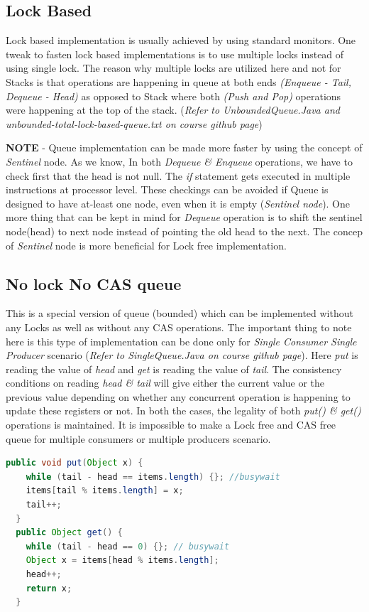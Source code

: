 \documentclass[twoside]{article}
\begin{document}
\subsection{Lock Based}

Lock based implementation is usually achieved by using standard monitors. One tweak to fasten lock based implementations is to use multiple locks instead of using single lock. The reason why multiple locks are utilized here and not for Stacks is that operations are happening in queue at both ends \textit{(Enqueue - Tail, Dequeue - Head)} as opposed to Stack where both \textit{(Push and Pop)} operations were happening at the top of the stack. (\textit{Refer to UnboundedQueue.Java and unbounded-total-lock-based-queue.txt on course github page})

\textbf{NOTE} - Queue implementation can be made more faster by using the concept of \textit{Sentinel} node. As we know, In both \textit{Dequeue \& Enqueue} operations, we have to check first that the head is not null. The \textit{if} statement gets executed in multiple instructions at processor level. These checkings can be avoided if Queue is designed to have at-least one node, even when it is empty (\textit{Sentinel node}). One more thing that can be kept in mind for \textit{Dequeue} operation is to shift the sentinel node(head) to next node instead of pointing the old head to the next. The concep of \textit{Sentinel} node is more beneficial for Lock free implementation.

\subsection{No lock No CAS queue}
This is a special version of queue (bounded) which can be implemented without any Locks as well as without any CAS operations. The important thing to note here is this type of implementation can be done only for \textit{Single Consumer Single Producer} scenario (\textit{Refer to SingleQueue.Java on course github page}). Here \textit{put} is reading the value of \textit{head} and \textit{get} is reading the value of \textit{tail}. The consistency conditions on reading \textit{head \& tail} will give either the current value or the previous value depending on whether any concurrent operation is happening to update these registers or not. In both the cases, the legality of both \textit{put() \& get()} operations is maintained. It is impossible to make a Lock free and CAS free queue for multiple consumers or multiple producers scenario.
\begin{center}
\renewcommand{\lstlistingname}{Code}
\begin{lstlisting}[language=Java, caption=No Lock No CAS Queue, frame=single]
  public void put(Object x) {
    while (tail - head == items.length) {}; //busywait
    items[tail % items.length] = x;
    tail++;
  }
  public Object get() {
    while (tail - head == 0) {}; // busywait
    Object x = items[head % items.length];
    head++;
    return x;
  }
\end{lstlisting}
\end{center}
\end{document}
